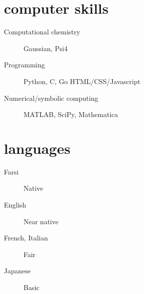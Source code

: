 \documentclass[overlapped,line,10pt,letterpaper]{res}
\begin{document}
\begin{resume}
\section{computer skills}
\begin{description}
\item[Computational chemistry] Gaussian, Psi4
\item[Programming] Python, C, Go HTML/CSS/Javascript
\item[Numerical/symbolic computing] MATLAB, SciPy, Mathematica
\end{description}

\section{languages}
\begin{description}
\item[Farsi] Native
\item[English] Near native
\item[French, Italian] Fair
\item[Japanese] Basic
\end{description}
\end{resume}
\end{document}
